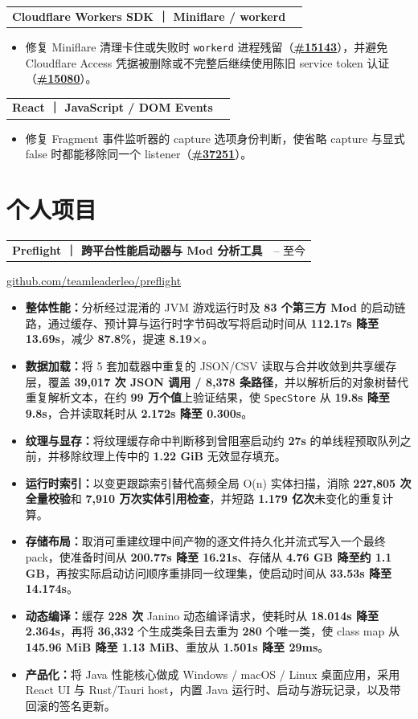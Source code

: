 \documentclass[UTF8,a4paper,11pt,fontset=none]{ctexart}
\makeatletter
\newcommand{\roleline}[2]{%
  \begin{tabularx}{\textwidth}{@{}Xr@{}}
    {\sffamily\bfseries\fontsize{10.78pt}{12.05pt}\selectfont #1} & {\sffamily\fontsize{8.8pt}{10.2pt}\selectfont #2}
  \end{tabularx}\vspace{-0.05pt}
}
\newcommand{\subroleline}[2]{%
  \vspace{-0.35pt}%
  \begin{tabularx}{\textwidth}{@{}Xr@{}}
    {\sffamily\bfseries\fontsize{10.2pt}{11.45pt}\selectfont #1} & {\sffamily\fontsize{8.65pt}{10.1pt}\selectfont #2}
  \end{tabularx}\vspace{-0.2pt}
}
\newcommand{\resumeliststart}{\begin{itemize}[leftmargin=1.42em,label=\textbullet,itemsep=0pt,parsep=0pt,topsep=-0.05pt,partopsep=0pt]}
\newcommand{\resumeitem}[1]{\item\fontsize{10.12pt}{10.68pt}\selectfont\RaggedRight #1}
\newcommand{\resumelistend}{\end{itemize}\vspace{0pt}}
\makeatother
\begin{document}
\subroleline{Cloudflare Workers SDK ｜ Miniflare / workerd}{2026.08}
\resumeliststart
  \resumeitem{修复 Miniflare 清理卡住或失败时 \texttt{workerd} 进程残留（\href{https://redirect.github.com/cloudflare/workers-sdk/pull/15143}{\textbf{\#15143}}），并避免 Cloudflare Access 凭据被删除或不完整后继续使用陈旧 service token 认证（\href{https://redirect.github.com/cloudflare/workers-sdk/pull/15080}{\textbf{\#15080}}）。}
\resumelistend

\subroleline{React ｜ JavaScript / DOM Events}{2026.08}
\resumeliststart
  \resumeitem{修复 Fragment 事件监听器的 capture 选项身份判断，使省略 capture 与显式 false 时都能移除同一个 listener（\href{https://redirect.github.com/react/react/pull/37251}{\textbf{\#37251}}）。}
\resumelistend

\section{个人项目}
\roleline{Preflight ｜ 跨平台性能启动器与 Mod 分析工具}{2026.07 -- 至今}
{\sffamily\fontsize{9.0pt}{10.08pt}\selectfont\href{https://github.com/teamleaderleo/preflight}{github.com/teamleaderleo/preflight}}\vspace{0.15pt}
\resumeliststart
  \resumeitem{\textsf{\bfseries 整体性能：}分析经过混淆的 JVM 游戏运行时及 \textbf{83 个第三方 Mod} 的启动链路，通过缓存、预计算与运行时字节码改写将启动时间从 \textbf{112.17s 降至 13.69s}，减少 \textbf{87.8\%}，提速 \textbf{8.19×}。}
  \resumeitem{\textsf{\bfseries 数据加载：}将 5 套加载器中重复的 JSON/CSV 读取与合并收敛到共享缓存层，覆盖 \textbf{39,017 次 JSON 调用 / 8,378 条路径}，并以解析后的对象树替代重复解析文本，在约 \textbf{99 万个值}上验证结果，使 \texttt{SpecStore} 从 \textbf{19.8s 降至 9.8s}，合并读取耗时从 \textbf{2.172s 降至 0.300s}。}
  \resumeitem{\textsf{\bfseries 纹理与显存：}将纹理缓存命中判断移到曾阻塞启动约 \textbf{27s} 的单线程预取队列之前，并移除纹理上传中的 \textbf{1.22 GiB} 无效显存填充。}
  \resumeitem{\textsf{\bfseries 运行时索引：}以变更跟踪索引替代高频全局 O(n) 实体扫描，消除 \textbf{227,805 次全量校验}和 \textbf{7,910 万次实体引用检查}，并短路 \textbf{1.179 亿次}未变化的重复计算。}
  \resumeitem{\textsf{\bfseries 存储布局：}取消可重建纹理中间产物的逐文件持久化并流式写入一个最终 pack，使准备时间从 \textbf{200.77s 降至 16.21s}、存储从 \textbf{4.76 GB 降至约 1.1 GB}，再按实际启动访问顺序重排同一纹理集，使启动时间从 \textbf{33.53s 降至 14.174s}。}
  \resumeitem{\textsf{\bfseries 动态编译：}缓存 \textbf{228 次} Janino 动态编译请求，使耗时从 \textbf{18.014s 降至 2.364s}，再将 \textbf{36,332} 个生成类条目去重为 \textbf{280} 个唯一类，使 class map 从 \textbf{145.96 MiB 降至 1.13 MiB}、重放从 \textbf{1.501s 降至 29ms}。}
  \resumeitem{\textsf{\bfseries 产品化：}将 Java 性能核心做成 Windows / macOS / Linux 桌面应用，采用 React UI 与 Rust/Tauri host，内置 Java 运行时、启动与游玩记录，以及带回滚的签名更新。}
\resumelistend
\end{document}
